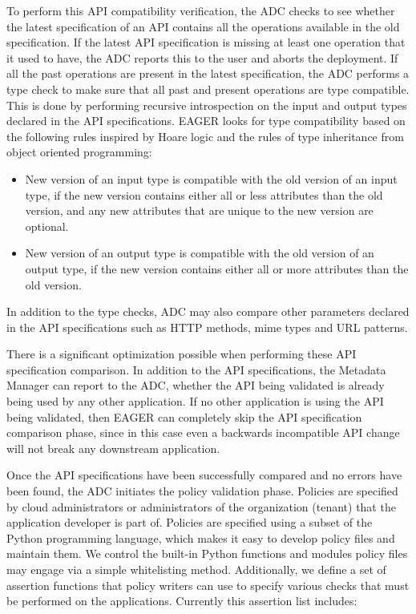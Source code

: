 To perform this API compatibility verification, the ADC checks to see whether the latest specification of an API contains all 
the operations available in the old specification. If the latest API specification is missing at least one operation that it used to have, the ADC
reports this to the user and aborts the deployment. If all the past operations are present in the latest specification, the ADC performs a 
type check to make sure that 
all past and present operations are type compatible. This is done by performing recursive introspection on the input and output types declared in the
API specifications. EAGER looks for type compatibility based on the following rules inspired by Hoare
logic and the rules of type inheritance from object oriented programming:
\begin{itemize}
\item New version of an input type is compatible with the old version of an input type, if the new version contains either all or less attributes than the 
old version, and any new attributes that are unique to the new version are optional.
\item New version of an output type is compatible with the old version of an output type, if the new version contains either all or more attributes than the 
old version.
\end{itemize}
In addition to the type checks, ADC may also compare other parameters declared in the API specifications
such as HTTP methods, mime types and URL patterns.

There is a significant optimization possible when performing these API specification comparison. In addition to the API specifications,
the Metadata Manager can report to the ADC, whether the API being validated is already being used by any other application. 
If no other application is using the API being validated, then EAGER
can completely skip the API specification comparison phase, since in this case even a backwards incompatible API change will not break any 
downstream application. 

Once the API specifications have been successfully compared and no errors have been found, the ADC initiates the policy validation phase. Policies
are specified by cloud administrators or administrators of the organization (tenant) that the application developer is part of. Policies are specified using
a subset of the Python programming language, which makes it easy to develop policy files and maintain them. We control the built-in Python functions and
modules policy files may engage via a simple whitelisting method. Additionally, we define a set of assertion functions that policy writers can use to specify
various checks that must be performed on the applications. Currently this assertion list includes:

